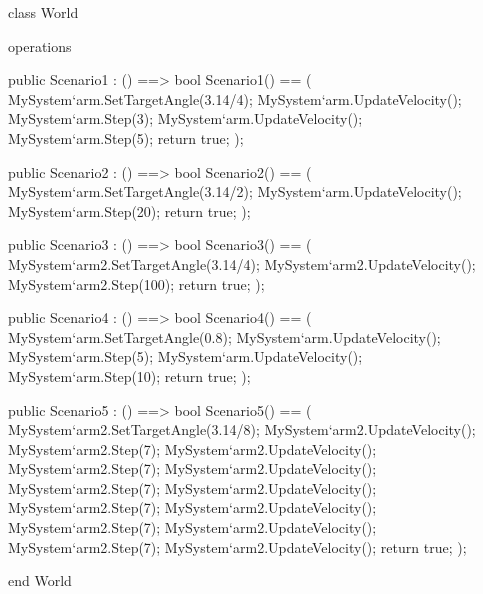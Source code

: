 \documentclass[a4paper]{article}
\begin{document}
\title{}
\author{}
\begin{vdm_al}
class World

operations

    public Scenario1 : () ==> bool
    Scenario1() == (
        MySystem`arm.SetTargetAngle(3.14/4);
        MySystem`arm.UpdateVelocity();
        MySystem`arm.Step(3);
        MySystem`arm.UpdateVelocity();
        MySystem`arm.Step(5);
        return true;
    );
    
    public Scenario2 : () ==> bool
    Scenario2() == (
        MySystem`arm.SetTargetAngle(3.14/2);
        MySystem`arm.UpdateVelocity();
        MySystem`arm.Step(20);
        return true;
    );

    public Scenario3 : () ==> bool
    Scenario3() == (
        MySystem`arm2.SetTargetAngle(3.14/4);
        MySystem`arm2.UpdateVelocity();
        MySystem`arm2.Step(100);
        return true;
    );

    public Scenario4 : () ==> bool
    Scenario4() == (
        MySystem`arm.SetTargetAngle(0.8);
        MySystem`arm.UpdateVelocity();
        MySystem`arm.Step(5);
        MySystem`arm.UpdateVelocity();
        MySystem`arm.Step(10);
        return true;
    );

    public Scenario5 : () ==> bool
    Scenario5() == (
        MySystem`arm2.SetTargetAngle(3.14/8);
        MySystem`arm2.UpdateVelocity();
        MySystem`arm2.Step(7);
        MySystem`arm2.UpdateVelocity();
        MySystem`arm2.Step(7);
        MySystem`arm2.UpdateVelocity();
        MySystem`arm2.Step(7);
        MySystem`arm2.UpdateVelocity();
        MySystem`arm2.Step(7);
        MySystem`arm2.UpdateVelocity();
        MySystem`arm2.Step(7);
        MySystem`arm2.UpdateVelocity();
        MySystem`arm2.Step(7);
        MySystem`arm2.UpdateVelocity();
        return true;
    );



end World
\end{vdm_al}
\end{document}
